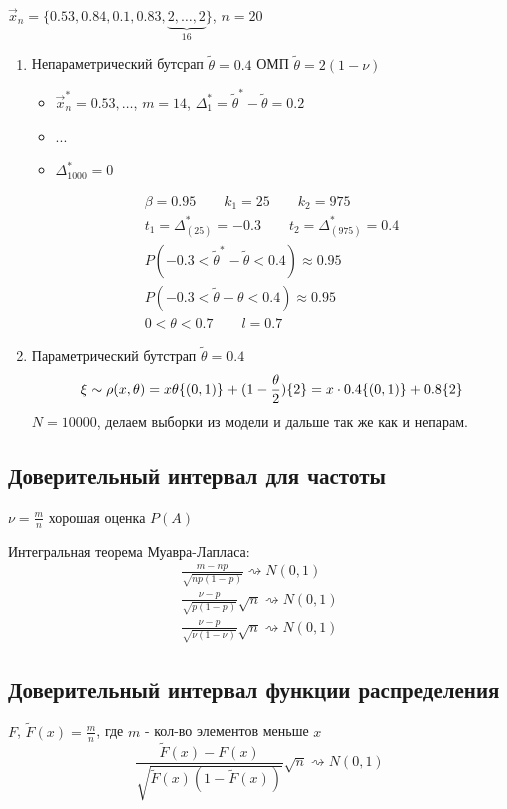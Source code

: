 \documentclass{article}
\begin{document}
\begin{eg}
  $\vec{x}_n=\{0.53, 0.84, 0.1, 0.83, \underbrace{2,\dots ,2}_{16}\}$, $n=20$
  \begin{enumerate}
    \item Непараметрический бутсрап $\tilde{\theta}=0.4$ ОМП $\tilde{\theta}=2(1-\nu)$
      \begin{itemize}
        \item $\vec{x}_n^{*}={0.53,\dots }$, $m=14$, $\Delta_1^{*}=\tilde\theta^{*}-\tilde{\theta}=0.2$
        \item ...
        \item $\Delta_{1 0 0 0}^{*}=0$
      \end{itemize}
      \begin{gather*}
        \beta=0.95 \qquad k_1=25 \qquad k_2=975 \\ 
        t_1=\Delta_{(25)}^{*}=-0.3 \qquad t_2=\Delta_{(975)}^{*}=0.4 \\ 
        P(-0.3<\tilde{\theta}^{*}-\tilde{\theta}<0.4)\approx 0.95 \\ 
        P(-0.3<\tilde{\theta}-\theta<0.4)\approx 0.95 \\ 
        0<\theta<0.7 \qquad l=0.7
      \end{gather*}
    \item Параметрический бутстрап $\tilde{\theta}=0.4$
      \[
        \xi \sim \rho(x,\theta)=x\theta\{(0,1)\} + (1-\frac{\theta}{2})\{2\} 
        =x \cdot 0.4 \{(0,1)\}+0.8\{2\}\\ 
      \]
      $N=10 0 0 0$, делаем выборки из модели и дальше так же как и непарам.
  \end{enumerate}
\end{eg}
\subsection{Доверительный интервал для частоты}
$\nu=\frac{m}{n}$ хорошая оценка $P(A)$

Интегральная теорема Муавра-Лапласа:
\begin{gather*}
  \frac{m-np}{\sqrt{np(1-p)}} \rightsquigarrow N(0,1) \\ 
  \frac{\nu-p}{\sqrt{p(1-p)}}\sqrt{n} \rightsquigarrow N(0,1) \\ 
  \frac{\nu-p}{\sqrt{\nu(1-\nu)}}\sqrt{n} \rightsquigarrow N(0,1)
\end{gather*}
\subsection{Доверительный интервал функции распределения}
$F$, $\tilde{F}(x)=\frac{m}{n}$, где $m$ - кол-во элементов меньше $x$
\[
  \frac{\tilde{F}(x)-F(x)}{\sqrt{\tilde{F}(x)(1-\tilde{F}(x))}}\sqrt{n}\rightsquigarrow N(0,1)
\]
\end{document}
